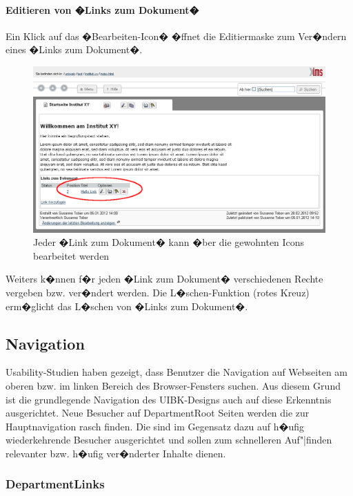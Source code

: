 \paragraph{Editieren von �Links zum Dokument�}

Ein Klick auf das �Bearbeiten-Icon� �ffnet die Editiermaske zum Ver�ndern eines
�Links zum Dokument�.

\begin{figure}[!ht]
	\centering
		\includegraphics[width=\textwidth]{./images/edit-linkzumdokument.png}
	\caption{Jeder �Link zum Dokument� kann �ber die gewohnten Icons bearbeitet werden}
	\label{fig:editdokumentlink}
\end{figure}

Weiters k�nnen f�r jeden �Link zum Dokument� verschiedenen Rechte
vergeben bzw. ver�ndert werden. Die L�schen-Funktion (rotes Kreuz)
erm�glicht das L�schen von �Links zum Dokument�.

\subsection{ Navigation}
\label{depnav}

Usability-Studien haben gezeigt, dass Benutzer die Navigation auf
Webseiten am oberen bzw. im linken Bereich des Browser-Fensters
suchen. Aus diesem Grund ist die grundlegende Navigation des
UIBK-Designs auch auf diese Erkenntnis ausgerichtet. Neue Besucher auf
DepartmentRoot Seiten werden die  zur
Hauptnavigation rasch finden. Die 
sind im Gegensatz dazu auf h�ufig wiederkehrende Besucher ausgerichtet
und sollen zum schnelleren Auf"|finden relevanter bzw. h�ufig
ver�nderter Inhalte dienen.

\subsubsection{DepartmentLinks}
\label{deplinks}

